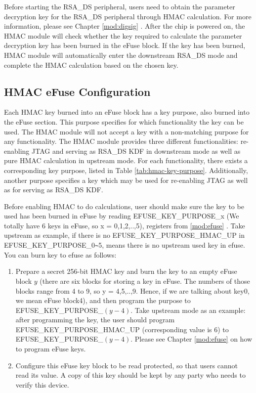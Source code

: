 \documentclass[main\_\_EN.tex]{subfiles}
\begin{document}
Before starting the RSA\_DS peripheral, users need to obtain the parameter decryption key for the RSA\_DS peripheral through HMAC calculation. For more information, please see Chapter \ref{mod:digsig} \textit{}.
After the chip is powered on, the HMAC module will check whether the key required to calculate the parameter decryption key has been burned in the eFuse block. If the key has been burned, HMAC module will automatically enter the downstream RSA\_DS mode and complete the HMAC calculation based on the chosen key.

\subsection{HMAC eFuse Configuration}
\label{sec:hmac-config-function}

Each HMAC key burned into an eFuse block has a key purpose, also burned into the eFuse section. This purpose specifies for which functionality the key can be used. The HMAC module will not accept a key with a non-matching purpose for any functionality. The HMAC module provides three different functionalities: re-enabling JTAG and serving as RSA\_DS KDF in downstream mode as well as pure HMAC calculation in upstream mode. For each functionality, there exists a corresponding key purpose, listed in Table \ref{tab:hmac-key-purpose}. Additionally, another purpose specifies a key which may be used for re-enabling JTAG as well as for serving as RSA\_DS KDF.

Before enabling HMAC to do calculations, user should make sure the key to be used has been burned in eFuse by reading EFUSE\_KEY\_PURPOSE\_x (We totally have 6 keys in eFuse, so x = 0,1,2,..,5), registers from \ref{mod:efuse} \textit{}. Take upstream as example, if there is no EFUSE\_KEY\_PURPOSE\_HMAC\_UP in \\EFUSE\_KEY\_PURPOSE\_0\verb+~+5, means there is no upstream used key in efuse. You can burn key to efuse as follows:

\begin{enumerate}
    \item Prepare a secret 256-bit HMAC key and burn the key to an empty eFuse block $y$ (there are six blocks for storing a key in eFuse. The numbers of those blocks range from 4 to 9, so y = 4,5,..,9. Hence, if we are talking about key0, we mean eFuse block4), and then program the purpose to EFUSE\_KEY\_PURPOSE\_$(y-4)$. Take upstream mode as an example: after programming the key, the user should program EFUSE\_KEY\_PURPOSE\_HMAC\_UP (corresponding value is 6) to EFUSE\_KEY\_PURPOSE\_$(y-4)$. Please see Chapter \ref{mod:efuse} \textit{} on how to program eFuse keys.
    \item Configure this eFuse key block to be read protected, so that users cannot read its value. A copy of this key should be kept by any party who needs to verify this device.
\end{enumerate}
\end{document}
